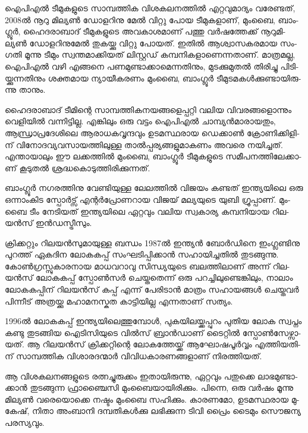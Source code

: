 \vskip 1pt

ഐ­പി­എല്‍ ടീ­മു­ക­ളു­ടെ സാ­മ്പ­ത്തിക വി­ശ­ക­ല­ന­ത്തില്‍ എറ്റ­വു­മാ­ദ്യം വരേ­ണ്ട­ത്, 2008ല്‍ നൂ­റു മി­ല്യണ്‍ ഡോ­ള­റി­നു മേല്‍ 
വി­റ്റു പോയ ടീ­മു­ക­ളാ­ണ്, മും­ബൈ, ബാം­ഗ്ലൂര്‍, ഹൈ­ദ­രാ­ബാ­ദ് ടീ­മു­ക­ളു­ടെ അവ­കാ­ശ­മാ­ണ് പത്തു വര്‍­ഷ­ത്തേ­ക്ക് 
നൂ­റു­മി­ല്യണ്‍ ഡോ­ള­റി­നു­മേല്‍ തു­ക­യ്ക്കു വി­റ്റു പോ­യ­ത്. ഇതില്‍ ആശ്വാ­സ­ക­ര­മായ സം­ഗ­തി മൂ­ന്നു ടീ­മും സ്വ­ന്ത­മാ­ക്കി­യ­ത് 
ലി­സ്റ്റ­ഡ് കമ്പ­നി­ക­ളാ­ണെ­ന്ന­താ­ണ്. മാ­ത്ര­മ­ല്ല, ഐ­പി­എല്‍ വഴി എങ്ങ­നെ പണ­മു­ണ്ടാ­ക്കാ­മെ­ന്ന­തി­നും, മു­ട­ക്കു­മു­തല്‍ തി­രി­ച്ചു 
പി­ടി­യ്ക്കു­ന്ന­തി­നും ശക്ത­മായ ന്യാ­യീ­ക­ര­ണം മും­ബൈ, ബാം­ഗ്ലൂര്‍ ടീ­മു­ട­മ­കള്‍­ക്കു­ണ്ടാ­യി­രു­ന്നു താ­നും.

­ഹൈ­ദ­രാ­ബാ­ദ് ടീ­മി­ന്റെ സാ­മ്പ­ത്തി­ക­ന­യ­ങ്ങ­ളെ­പ്പ­റ്റി വലിയ വി­വ­ര­ങ്ങ­ളൊ­ന്നും വെ­ളി­യില്‍ വന്നി­ട്ടി­ല്ല. എങ്കി­ലും ഒരു വട്ടം 
ഐപി­എല്‍ ചാ­മ്പ്യന്‍­മാ­രാ­യ­തും, ആന്ധ്രാ­പ്ര­ദേ­ശി­ലെ ആരാ­ധ­ക­വൃ­ന്ദ­വും ഉട­മ­സ്ഥ­രായ ഡെ­ക്കാണ്‍ ക്രോ­ണി­ക്കി­ളി­ന് 
വി­നോ­ദ­വ്യ­വ­സാ­യ­ത്തി­ലു­ള്ള താല്‍­പ്പ­ര്യ­ങ്ങ­ളു­മാ­ക­ണം അവ­രെ നയി­ച്ച­ത്. എന്താ­യാ­ലും ഈ ലക്ക­ത്തില്‍ മും­ബൈ, 
ബാം­ഗ്ലൂര്‍ ടീ­മു­ക­ളു­ടെ സമീ­പ­ന­ത്തി­ലേ­ക്കാ­ണ് കൂ­ടു­തല്‍ ശ്ര­ദ്ധ­കൊ­ടു­ത്തി­രി­ക്കു­ന്ന­ത്.

­ബാം­ഗ്ലൂര്‍ നഗ­ര­ത്തി­നു വേ­ണ്ടി­യു­ള്ള ലേ­ല­ത്തില്‍ വി­ജ­യം കണ്ട­ത് ഇന്ത്യ­യി­ലെ ഒരു ഒന്നാം­കിട സ്പോര്‍­ട്സ് എന്റര്‍­പ്രോ­ണ­റായ 
വി­ജ­യ് മല്യ­യു­ടെ യു­ബി ഗ്രൂ­പ്പാ­ണ്. മും­ബൈ ടീം നേ­ടി­യ­ത് ഇന്ത്യ­യി­ലെ ഏറ്റ­വും വലിയ സ്വ­കാ­ര്യ കമ്പ­നി­യായ ­റി­ല­യന്‍­സ് 
ഇന്‍­ഡ­സ്ട്രീ­സും­.


­ക്രി­ക്ക­റ്റും റി­ല­യന്‍­സു­മാ­യു­ള്ള ബന്ധം 1987ല്‍ ഇന്ത്യന്‍ ബോര്‍­ഡി­നെ ഇം­ഗ്ല­ണ്ടി­നു പു­റ­ത്ത് ഏക­ദിന ലോ­ക­ക­പ്പ് 
സം­ഘ­ടി­പ്പി­ക്കാന്‍ സഹാ­യി­ച്ച­തില്‍ തു­ട­ങ്ങു­ന്നു. കോണ്‍­ഗ്ര­സ്സു­കാ­ര­നായ മാ­ധ­വ­റാ­വു സി­ന്ധ്യ­യു­ടെ ബല­ത്തി­ലാ­ണ് 
അന്ന് റി­ല­യന്‍­സ് ലോ­ക­ക­പ്പ് സ്പോണ്‍­സര്‍ ചെ­യ്ത­തെ­ന്ന് ഒരു പറ­ച്ചി­ലു­ണ്ടെ­ങ്കി­ലും, നാ­ലാം ലോ­ക­ക­പ്പി­ന് റി­ല­യന്‍­സ് 
കപ്പ് എന്ന് പേ­രി­ടാന്‍ മാ­ത്രം സഹാ­യ­ങ്ങള്‍ ചെ­യ്ത­വര്‍ പി­ന്നീ­ട് അത്ര­യ്ക്കു മഹാ­മ­ന­സ്കത കാ­ട്ടി­യി­ല്ല എന്ന­താ­ണ് സത്യം.

1996ല്‍ ലോ­ക­ക­പ്പ് ഇന്ത്യ­യി­ലെ­ത്തു­മ്പോള്‍, പു­ക­യി­ല­യ്ക്ക­പ്പു­റം പു­തിയ ലോക സ്വ­പ്നം കണ്ടു തു­ട­ങ്ങിയ ഐടി­സി­യു­ടെ 
വില്‍­സ് ബ്രാന്‍­ഡാ­ണ് ടൈ­റ്റില്‍ സ്പോണ്‍­സേ­ഴ്സാ­യ­ത്. ആ റി­ല­യന്‍­സ് ക്രി­ക്ക­റ്റി­ന്റെ ലോ­ക­ത്തേ­യ്ക്ക് ആഘോ­ഷ­പൂര്‍‌­വ്വം 
എത്തി­യ­തി­ന് സാ­മ്പ­ത്തിക വി­ശാ­ര­ദ­ന്മാര്‍ വി­വി­ധ­കാ­ര­ണ­ങ്ങ­ളാ­ണ് നി­ര­ത്തി­യ­ത്.

ആ വി­ശ­ക­ല­ന­ങ്ങ­ളു­ടെ രത്ന­ച്ചു­രു­ക്കം ഇതാ­യി­രു­ന്നു, ഏറ്റ­വും പതു­ക്കെ ലാ­ഭ­മു­ണ്ടാ­ക്കാന്‍ തു­ട­ങ്ങു­ന്ന ഫ്രാ­ഞ്ചൈ­സി 
മും­ബൈ­യാ­യി­രി­ക്കും. പി­ന്നെ, ഒരു വര്‍­ഷം മൂ­ന്നു മി­ല്യണ്‍ വരെ­യൊ­ക്കെ നഷ്ടം മും­ബൈ സഹി­ക്കും. കാ­ര­ണ­മോ, 
ഉട­മ­സ്ഥ­രായ മു­കേ­ഷ്, നി­താ അം­ബാ­നി ദമ്പ­തി­കള്‍­ക്കു ലഭി­ക്കു­ന്ന ടി­വി പ്രൈം ടൈ­മും സൌ­ജ­ന്യ പര­സ്യ­വും­.


